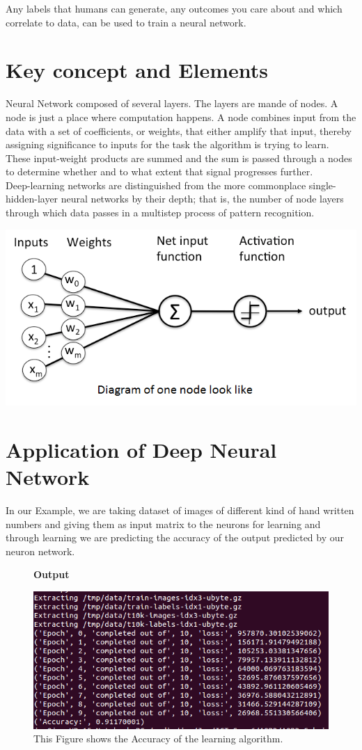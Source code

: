 \documentclass[journal, a4paper]{IEEEtran}
\begin{document}
	Any labels that humans can generate, any outcomes you care about and which correlate to data, can be used to train a neural network. 
	
\section{Key concept and Elements}
	Neural Network composed of several layers. The layers are mande of nodes. A node is just a place where computation happens. A node combines input from the data with a set of coefficients, or weights, that either amplify that input, thereby assigning significance to inputs for the task the algorithm is trying to learn. These input-weight products are summed and the sum is passed through a nodes to determine whether and to what extent that signal progresses further.\\Deep-learning networks are distinguished from the more commonplace single-hidden-layer neural networks by their depth; that is, the number of node layers through which data passes in a multistep process of pattern recognition.
	
	\includegraphics[scale=0.4]{first.PNG}

\FloatBarrier
\section{Application of Deep Neural Network}
	In our Example, we are taking dataset of images of different kind of hand written numbers and giving them as input matrix to the neurons for learning and through learning we are predicting the accuracy of the output predicted by our neuron network. 
		
	\begin{figure}[h]
    	\centering
    	\textbf{Output}\par\medskip
    	\includegraphics[scale=0.3]{Output.png}
    	\caption{This Figure shows the Accuracy of the learning algorithm.}
	\end{figure}
	
\end{document}
